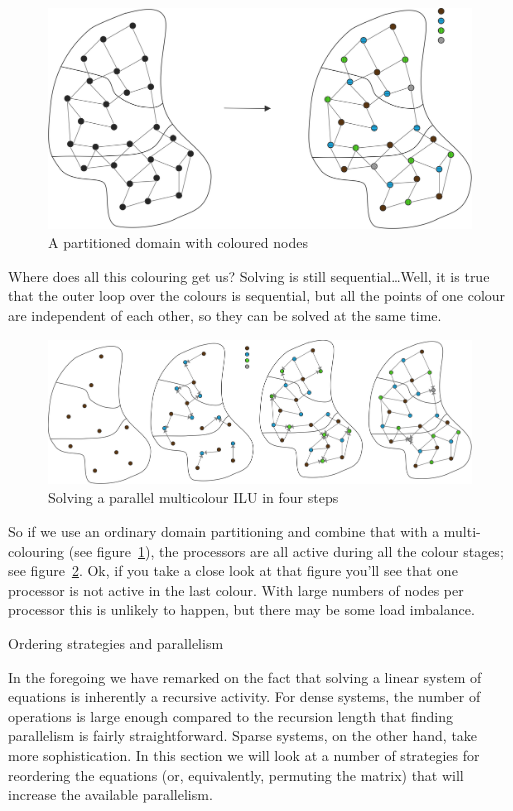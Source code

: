 \begin{figure}
  \includegraphics[scale=.12]{graphics/pilu}
  \caption{A partitioned domain with coloured nodes}
  \label{fig:pilu}
\end{figure}
Where does all this colouring get us? Solving is still
sequential\ldots Well, it is true that the outer loop over the colours
is sequential, but all the points of one colour are independent of
each other, so they can be solved at the same time.
\begin{figure}
  \includegraphics[scale=.13]{graphics/pilu-solve}
  \caption{Solving a parallel multicolour ILU in four steps}
  \label{fig:pilu-solve}
\end{figure}
So if we use an ordinary domain partitioning and combine that with a
multi-colouring (see figure~\ref{fig:pilu}), the processors are all
active during all the colour stages; see
figure~\ref{fig:pilu-solve}. Ok, if you take a close look at that
figure you'll see that one processor is not active in the last
colour. With large numbers of nodes per processor this is unlikely to
happen, but there may be some load imbalance.


 {Ordering strategies and parallelism}
\label{sec:ordering}

In the foregoing we have remarked on the fact that solving
a linear system of equations is inherently a recursive activity.
For dense systems, the number of operations is large enough
compared to the recursion length that finding parallelism 
is fairly straightforward. Sparse systems, on the other hand,
take more sophistication. In this section we will look at 
a number of strategies for reordering the equations (or, equivalently,
permuting the matrix) that will increase the available parallelism.

